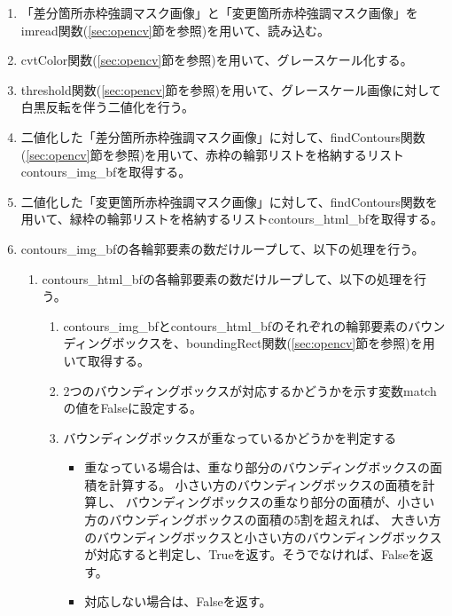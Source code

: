 \begin{enumerate}
    \item 「差分箇所赤枠強調マスク画像」と「変更箇所赤枠強調マスク画像」をimread関数(\ref{sec:opencv}節を参照)を用いて、読み込む。
    \item cvtColor関数(\ref{sec:opencv}節を参照)を用いて、グレースケール化する。
    \item threshold関数(\ref{sec:opencv}節を参照)を用いて、グレースケール画像に対して白黒反転を伴う二値化を行う。
    \item 二値化した「差分箇所赤枠強調マスク画像」に対して、findContours関数(\ref{sec:opencv}節を参照)を用いて、赤枠の輪郭リストを格納するリストcontours\_img\_bfを取得する。
    \item 二値化した「変更箇所赤枠強調マスク画像」に対して、findContours関数を用いて、緑枠の輪郭リストを格納するリストcontours\_html\_bfを取得する。
    \item contours\_img\_bfの各輪郭要素の数だけループして、以下の処理を行う。
          \begin{enumerate}
              \item contours\_html\_bfの各輪郭要素の数だけループして、以下の処理を行う。
                    \begin{enumerate}
                        \item contours\_img\_bfとcontours\_html\_bfのそれぞれの輪郭要素のバウンディングボックスを、boundingRect関数(\ref{sec:opencv}節を参照)を用いて取得する。
                        \item 2つのバウンディングボックスが対応するかどうかを示す変数matchの値をFalseに設定する。
                        \item バウンディングボックスが重なっているかどうかを判定する
                              \begin{itemize}
                                  \item  重なっている場合は、重なり部分のバウンディングボックスの面積を計算する。
                                        小さい方のバウンディングボックスの面積を計算し、
                                        バウンディングボックスの重なり部分の面積が、小さい方のバウンディングボックスの面積の5割を超えれば、
                                        大きい方のバウンディングボックスと小さい方のバウンディングボックスが対応すると判定し、Trueを返す。そうでなければ、Falseを返す。
                                  \item 対応しない場合は、Falseを返す。
                              \end{itemize}

\end{enumerate}
\end{enumerate}
\end{enumerate}
